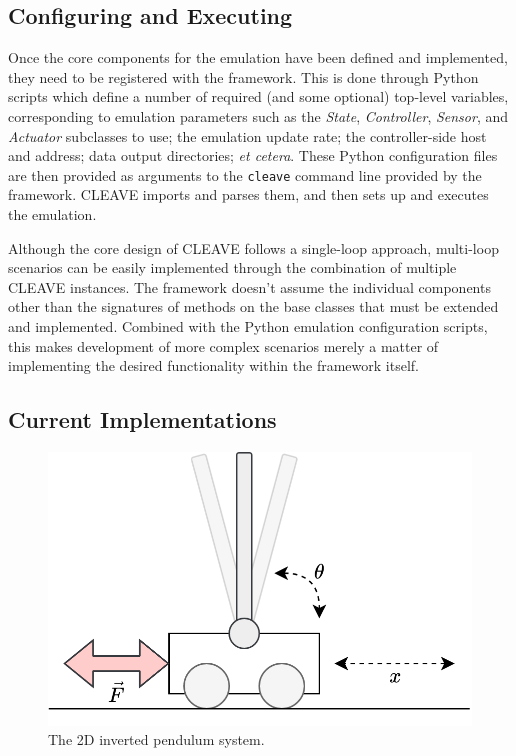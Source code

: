 \subsection{Configuring and Executing }

Once the core components for the emulation have been defined and implemented, they need to be registered with the framework.
This is done through Python scripts which define a number of required (and some optional) top-level variables, corresponding to emulation parameters such as the \emph{State}, \emph{Controller}, \emph{Sensor}, and \emph{Actuator} subclasses to use; the emulation update rate; the controller-side host and address; data output directories; \emph{et cetera}.
These Python configuration files are then provided as arguments to the \texttt{cleave} command line provided by the framework.
\ac{CLEAVE} imports and parses them, and then sets up and executes the emulation.

Although the core design of \ac{CLEAVE} follows a single-loop approach, multi-loop scenarios can be easily implemented through the combination of multiple \ac{CLEAVE} instances.
The framework doesn't assume the individual components other than the signatures of methods on the base classes that must be extended and implemented.
Combined with the Python emulation configuration scripts, this makes development of more complex scenarios merely a matter of implementing the desired functionality within the framework itself.

\subsection{Current Implementations}

\begin{figure}
    \centering
    \includegraphics[width=.7\columnwidth]{images/inverted_pendulum.png}
    \caption{
        The 2D inverted pendulum system.
    }\label{fig:invpend}
\end{figure}

